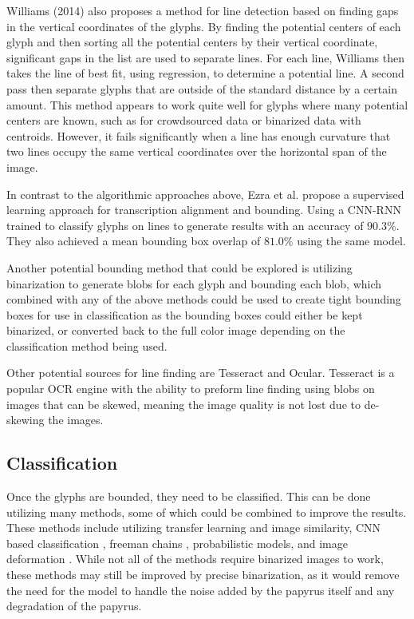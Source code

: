 \documentclass[12pt,a4paper,final]{article}
\begin{document}
Williams (2014)\cite{Williams2014} also proposes a method for line detection based on finding gaps in the vertical coordinates of the glyphs. By finding the potential centers of each glyph and then sorting all the potential centers by their vertical coordinate, significant gaps in the list are used to separate lines. For each line, Williams then takes the line of best fit, using regression, to determine a potential line. A second pass then separate glyphs that are outside of the standard distance by a certain amount. This method appears to work quite well for glyphs where many potential centers are known, such as for crowdsourced data or binarized data with centroids. However, it fails significantly when a line has enough curvature that two lines occupy the same vertical coordinates over the horizontal span of the image.

In contrast to the algorithmic approaches above, Ezra et al.\cite{Ezra} propose a supervised learning approach for transcription alignment and bounding. Using a CNN-RNN trained to classify glyphs on lines to generate results with an accuracy of $90.3\%$. They also achieved a mean bounding box overlap of $81.0\%$ using the same model.

Another potential bounding method that could be explored is utilizing binarization to generate blobs for each glyph and bounding each blob, which combined with any of the above methods could be used to create tight bounding boxes for use in classification as the bounding boxes could either be kept binarized, or converted back to the full color image depending on the classification method being used.

Other potential sources for line finding are Tesseract\cite{SmithTesseract} and Ocular\cite{Berg-Kirkpatrick}. Tesseract is a popular OCR engine with the ability to preform line finding \cite{SmithLines} using blobs on images that can be skewed, meaning the image quality is not lost due to de-skewing the images.

\subsection{Classification}

Once the glyphs are bounded, they need to be classified. This can be done utilizing many methods, some of which could be combined to improve the results.
These methods include utilizing transfer learning and image similarity\cite{Vadicamo, Yuan}, CNN based classification \cite{Yousefi, Haliassos, Swindall}, freeman chains \cite{Althobaiti}, probabilistic models\cite{Berg-Kirkpatrick}, and image deformation \cite{Nederhof, Keysers, Tabin, Gass}. While not all of the methods require binarized images to work, these methods may still be improved by precise binarization, as it would remove the need for the model to handle the noise added by the papyrus itself and any degradation of the papyrus.
\end{document}
